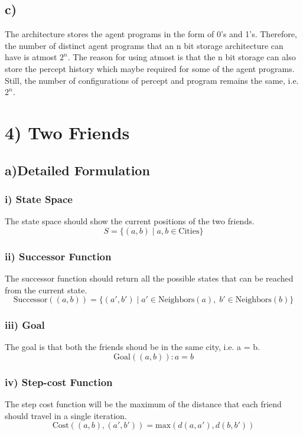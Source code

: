\documentclass[12pt]{scrartcl}
\begin{document}
    \subsection*{c)}
        The architecture stores the agent programs in the form of 0's and 1's.
        Therefore, the number of distinct agent programs that an n bit storage architecture can have is atmost $2^{n}$.
        The reason for using atmost is that the n bit storage can also store the percept history which maybe required for some of the agent programs.
        Still, the number of configurations of percept and program remains the same, i.e. $2^{n}$.

\section*{4) Two Friends}
    \subsection*{a)Detailed Formulation}
        \subsubsection*{i) State Space}
            The state space should show the current positions of the two friends.
            \[ S = \{(a,b) \mid a,b \in \text{Cities}\}\]
        \subsubsection*{ii) Successor Function}
            The successor function should return all the possible states that can be reached from the current state.
            \[\text{Successor}((a, b)) = \{(a', b') \mid a' \in \text{Neighbors}(a),\; b' \in \text{Neighbors}(b)\}\]
        \subsubsection*{iii) Goal}
            The goal is that both the friends shoud be in the same city, i.e. a = b.
            \[\text{Goal}((a, b)) \colon a = b\]
        \subsubsection*{iv) Step-cost Function}
            The step cost function will be the maximum of the distance that each friend should travel in a single iteration.
            \[\text{Cost}((a, b),(a', b')) = \text{max}(d(a, a'), d(b, b'))\]
\end{document}
